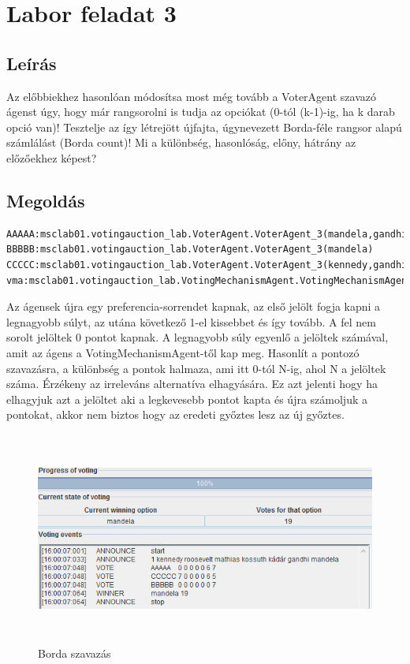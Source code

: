 \section{Labor feladat 3}
\subsection{Leírás}
Az előbbiekhez hasonlóan módosítsa most még tovább a VoterAgent szavazó ágenst úgy,
hogy már rangsorolni is tudja az opciókat (0-tól (k-1)-ig, ha k darab opció van)! Tesztelje az
így létrejött újfajta, úgynevezett Borda-féle rangsor alapú számlálást (Borda count)! Mi a
különbség, hasonlóság, előny, hátrány az előzőekhez képest?
\subsection{Megoldás}
\begin{lstlisting}[caption=Használt run-config, frame=single,float=!ht]
AAAAA:msclab01.votingauction_lab.VoterAgent.VoterAgent_3(mandela,gandhi)
BBBBB:msclab01.votingauction_lab.VoterAgent.VoterAgent_3(mandela)
CCCCC:msclab01.votingauction_lab.VoterAgent.VoterAgent_3(kennedy,gandhi,mandela)
vma:msclab01.votingauction_lab.VotingMechanismAgent.VotingMechanismAgent(voting01.cfg)
\end{lstlisting}
Az ágensek újra egy preferencia-sorrendet kapnak, az első jelölt fogja kapni a legnagyobb súlyt, az utána következő 1-el kissebbet és így tovább. A fel nem sorolt jelöltek 0 pontot kapnak. A legnagyobb súly egyenlő a jelöltek számával, amit az ágens a VotingMechanismAgent-től kap meg. Hasonlít a pontozó szavazásra, a különbség a pontok halmaza, ami itt 0-tól N-ig, ahol  N a jelöltek száma. Érzékeny az irreleváns alternatíva elhagyására. Ez azt jelenti hogy ha elhagyjuk azt a jelöltet aki a legkevesebb pontot kapta és újra számoljuk a pontokat, akkor nem biztos hogy az eredeti győztes lesz az új győztes.
\begin{figure}[!h]
\begin{center}
\includegraphics[height=7cm]{figures/fel3.png}
\caption{Borda szavazás}
\end{center}
\end{figure}

